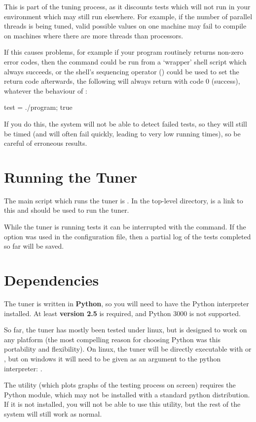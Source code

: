\documentclass[a4paper, draft]{article}
\begin{document}
This is part of the tuning process, 
as it discounts tests which will not run in your environment which may still 
run elsewhere. For example, if the number of parallel threads is being tuned, 
valid possible values on one machine may fail to compile on machines where 
there are more threads than processors. 

If this causes problems, for example 
if your program routinely returns non-zero error codes, then the 
 command could be run from a `wrapper' shell script which 
always succeeds, or the shell's sequencing operator (\command{;}) could be 
used to set the return code afterwards, the following will always return 
with code 0 (success), whatever the behaviour of :
\begin{Code}[numbers=none]
test = ./program; true
\end{Code}

If you do this, the system will not be able to detect failed tests, so they 
will still be timed (and will often fail quickly, leading to very low running 
times), so be careful of erroneous results.






\section{Running the Tuner}
The main script which runs the tuner is . In the 
top-level directory,  is a link to this and should be used 
to run the tuner.

While the tuner is running tests it can be interrupted with the 
 command. If the  option was used in the 
configuration file, then a partial log of the tests completed so far will 
be saved.



\section{Dependencies}
The tuner is written in \textbf{Python}, so you will need to have the Python 
interpreter installed. At least \textbf{version 2.5} is required, and 
Python 3000 is not supported.

So far, the tuner has mostly been tested under linux, but is
designed to work on any platform (the most compelling reason for choosing 
Python was this portability and flexibility). On linux, the 
tuner will be directly executable with  or 
, but on windows it will need to be given as an 
argument to the python interpreter: 
.

The utility  (which plots graphs of the testing 
process on screen) requires the  
Python module, which may not be installed with a standard python 
distribution. If it is not installed, you will not be able to use this 
utility, but the rest of the system will still work as normal.
\end{document}
